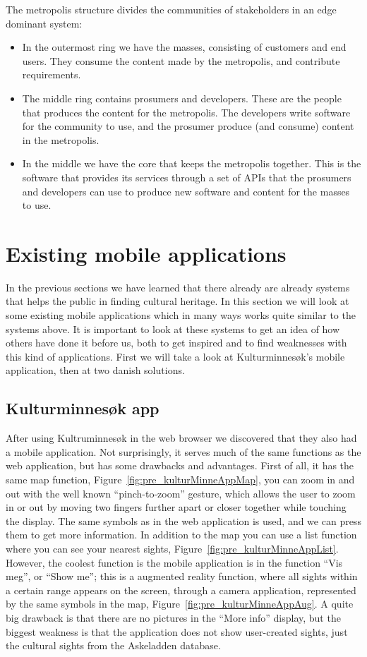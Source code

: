 \documentclass[11pt]{book}
\begin{document}
The metropolis structure divides the communities of stakeholders in an edge dominant system:

\begin{itemize}
  \item In the outermost ring we have the masses, consisting of customers and end users. They consume the content made by the metropolis, and contribute requirements.
  \item The middle ring contains prosumers and developers. These are the people that produces the content for the metropolis. The developers write software for the community to use, and the prosumer produce (and consume) content in the metropolis.
  \item In the middle we have the core that keeps the metropolis together. This is the software that provides its services through a set of APIs that the prosumers and developers can use to produce new software and content for the masses to use.
\end{itemize}

\section{Existing mobile applications}\label{sec:prestudy_existing_apps}
In the previous sections we have learned that there already are already systems that helps the public in finding cultural heritage. In this section we will look at some existing mobile applications which in many ways works quite similar to the systems above. It is important to look at these systems to get an idea of how others have done it before us, both to get inspired and to find weaknesses with this kind of applications. First we will take a look at Kulturminnesøk's mobile application, then at two danish solutions.

\subsection{Kulturminnesøk app}
After using Kultruminnesøk in the web browser we discovered that they also had a mobile application. Not surprisingly, it serves much of the same functions as the web application, but has some drawbacks and  advantages. First of all, it has the same map function, Figure~\ref{fig:pre_kulturMinneAppMap}, you can zoom in and out with the well known ``pinch-to-zoom'' gesture, which allows the user to zoom in or out by moving two fingers further apart or closer together while touching the display. The same symbols as in the web application is used, and we can press them to get more information. In addition to the map you can use a list function where you can see your nearest sights, Figure~\ref{fig:pre_kulturMinneAppList}. However, the coolest function is the mobile application is in the function ``Vis meg'', or ``Show me''; this is a augmented reality function, where all sights within a certain range appears on the screen, through a camera application, represented by the same symbols in the map, Figure~\ref{fig:pre_kulturMinneAppAug}.  A quite big drawback is that there are no pictures in the ``More info'' display, but the biggest weakness is that the application does not show user-created sights, just the cultural sights from the Askeladden database.
\end{document}
